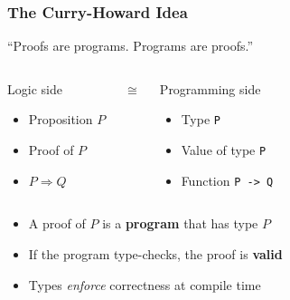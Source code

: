 \begin{frame}
\frametitle{The Curry-Howard Idea}
\begin{center}
\Large ``Proofs are programs. Programs are proofs.''
\end{center}
\vspace{0.3cm}
\begin{columns}[T]
\begin{block}{Logic side}
  \begin{itemize}
    \item Proposition $P$
    \item Proof of $P$
    \item $P \Rightarrow Q$
  \end{itemize}
\end{block}
\begin{center}
\vspace{0.6cm}
\Large $\cong$
\end{center}
\begin{block}{Programming side}
  \begin{itemize}
    \item Type \texttt{P}
    \item Value of type \texttt{P}
    \item Function \texttt{P -> Q}
  \end{itemize}
\end{block}
\end{columns}
\vfill
\begin{itemize}
  \item A proof of $P$ is a \textbf{program} that has type $P$
  \item If the program type-checks, the proof is \textbf{valid}
  \item Types \emph{enforce} correctness at compile time
\end{itemize}
\end{frame}

